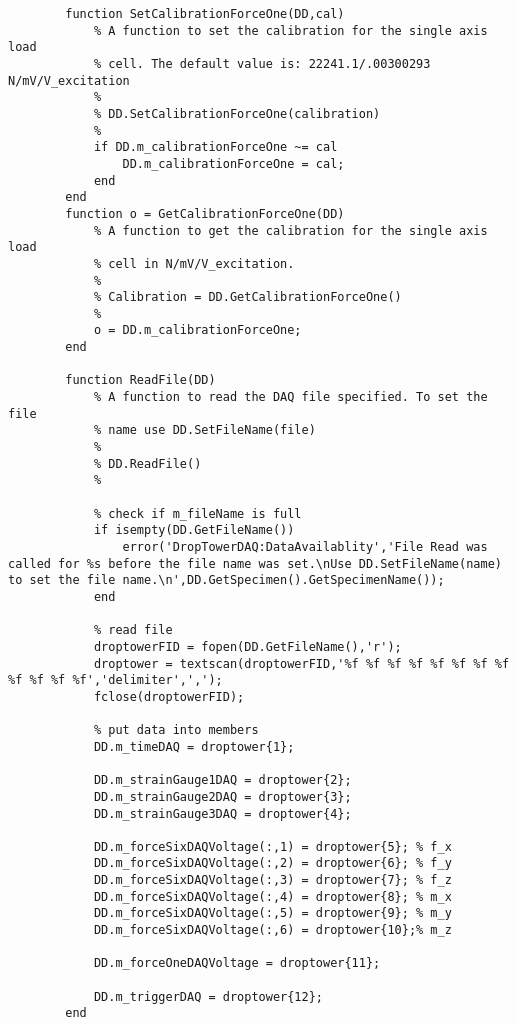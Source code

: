 \begin{lstlisting}
        function SetCalibrationForceOne(DD,cal)
            % A function to set the calibration for the single axis load
            % cell. The default value is: 22241.1/.00300293 N/mV/V_excitation
            %
            % DD.SetCalibrationForceOne(calibration)
            %
            if DD.m_calibrationForceOne ~= cal
                DD.m_calibrationForceOne = cal;
            end
        end
        function o = GetCalibrationForceOne(DD)
            % A function to get the calibration for the single axis load
            % cell in N/mV/V_excitation.
            %
            % Calibration = DD.GetCalibrationForceOne()
            %
            o = DD.m_calibrationForceOne;
        end
        
        function ReadFile(DD)
            % A function to read the DAQ file specified. To set the file
            % name use DD.SetFileName(file)
            %
            % DD.ReadFile()
            %
            
            % check if m_fileName is full
            if isempty(DD.GetFileName())
                error('DropTowerDAQ:DataAvailablity','File Read was called for %s before the file name was set.\nUse DD.SetFileName(name) to set the file name.\n',DD.GetSpecimen().GetSpecimenName());
            end           
            
            % read file
            droptowerFID = fopen(DD.GetFileName(),'r');
            droptower = textscan(droptowerFID,'%f %f %f %f %f %f %f %f %f %f %f %f','delimiter',',');
            fclose(droptowerFID);
            
            % put data into members            
            DD.m_timeDAQ = droptower{1};
            
            DD.m_strainGauge1DAQ = droptower{2};
            DD.m_strainGauge2DAQ = droptower{3};
            DD.m_strainGauge3DAQ = droptower{4};
            
            DD.m_forceSixDAQVoltage(:,1) = droptower{5}; % f_x
            DD.m_forceSixDAQVoltage(:,2) = droptower{6}; % f_y
            DD.m_forceSixDAQVoltage(:,3) = droptower{7}; % f_z
            DD.m_forceSixDAQVoltage(:,4) = droptower{8}; % m_x
            DD.m_forceSixDAQVoltage(:,5) = droptower{9}; % m_y
            DD.m_forceSixDAQVoltage(:,6) = droptower{10};% m_z
            
            DD.m_forceOneDAQVoltage = droptower{11};
            
            DD.m_triggerDAQ = droptower{12};
        end
        

\end{lstlisting}
